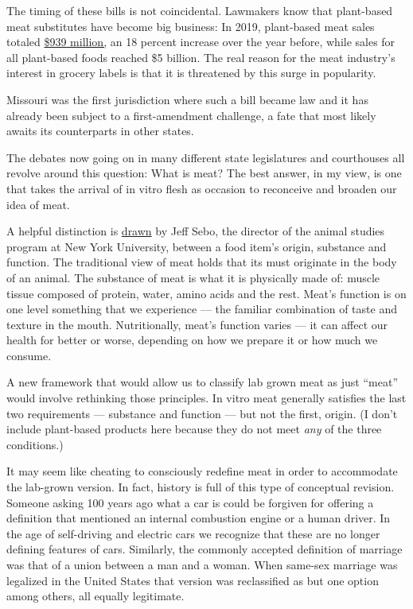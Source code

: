 The timing of these bills is not coincidental. Lawmakers know that
plant-based meat substitutes have become big business: In 2019,
plant-based meat sales totaled
\href{https://www.gfi.org/blog-state-of-the-industry-2020\#:~:text=SPINS\%20data\%20compiled\%20by\%20GFI,has\%20greatly\%20outstripped\%20conventional\%20meat.}{\$939
million,} an 18 percent increase over the year before, while sales for
all plant-based foods reached \$5 billion. The real reason for the meat
industry's interest in grocery labels is that it is threatened by this
surge in popularity.

Missouri was the first jurisdiction where such a bill became law and it
has already been subject to a first-amendment challenge, a fate that
most likely awaits its counterparts in other states.

The debates now going on in many different state legislatures and
courthouses all revolve around this question: What is meat? The best
answer, in my view, is one that takes the arrival of in vitro flesh as
occasion to reconceive and broaden our idea of meat.

A helpful distinction is
\href{https://www.erudit.org/en/journals/ateliers/2018-v13-n1-ateliers04192/1055123ar/}{drawn}
by Jeff Sebo, the director of the animal studies program at New York
University, between a food item's origin, substance and function. The
traditional view of meat holds that its must originate in the body of an
animal. The substance of meat is what it is physically made of: muscle
tissue composed of protein, water, amino acids and the rest. Meat's
function is on one level something that we experience --- the familiar
combination of taste and texture in the mouth. Nutritionally, meat's
function varies --- it can affect our health for better or worse,
depending on how we prepare it or how much we consume.

A new framework that would allow us to classify lab grown meat as just
``meat'' would involve rethinking those principles. In vitro meat
generally satisfies the last two requirements --- substance and function
--- but not the first, origin. (I don't include plant-based products
here because they do not meet \emph{any} of the three conditions.)

It may seem like cheating to consciously redefine meat in order to
accommodate the lab-grown version. In fact, history is full of this type
of conceptual revision. Someone asking 100 years ago what a car is could
be forgiven for offering a definition that mentioned an internal
combustion engine or a human driver. In the age of self-driving and
electric cars we recognize that these are no longer defining features of
cars. Similarly, the commonly accepted definition of marriage was that
of a union between a man and a woman. When same-sex marriage was
legalized in the United States that version was reclassified as but one
option among others, all equally legitimate.

